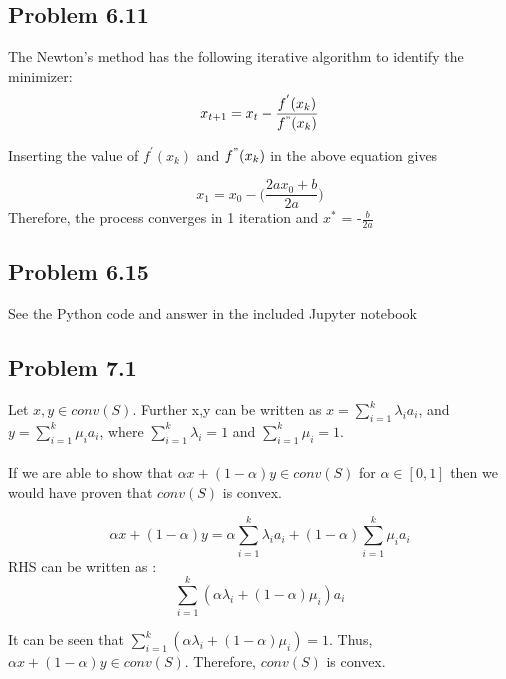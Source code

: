 \documentclass[letterpaper,12pt]{article}
\theoremstyle{definition}
\begin{document}
\subsection*{Problem 6.11}

The Newton's method has the following iterative algorithm to identify the minimizer:
  \begin{equation*}
x_{t+1}  =x_{t} - \frac{f^{'}(x_k)}{f^{"}(x_k)}
\end{equation*}  
\begin{flushleft}
Inserting the value of $f^{'}(x_k)$ and $f^{"}(x_k)$ in the above equation gives
\end{flushleft}
  \begin{equation*}
x_{1}  =x_{0} - \Big(\frac{2ax_{0}+b}{2a}\Big)
\end{equation*} 
Therefore, the process converges in 1 iteration and $x^*$ =  -$\frac{b}{2a}$ 



\subsection*{Problem 6.15}

See the Python code and answer in the included Jupyter notebook

\subsection*{Problem 7.1}

Let $x,y \in conv(S)$. Further x,y can be written as $x = \sum_{i=1}^{k} \lambda_i a_i $, and $y = \sum_{i=1}^{k} \mu_i a_i$, where $\sum_{i=1}^{k} \lambda_i =1 $ and $ \sum_{i=1}^{k} \mu_i = 1 $.\\\\
If we are able to show that $\alpha x + (1-\alpha) y \in conv(S)$ for $\alpha \in [0,1]$ then we would have proven that $conv(S)$  is convex.

\begin{equation*}
\alpha x + (1-\alpha) y = \alpha\sum_{i=1}^{k} \lambda_ia_i   + (1-\alpha)\sum_{i=1}^{k}\mu_i a_i 
\end{equation*}
RHS can be written as :
\begin{equation*}
\sum_{i=1}^{k} (\alpha\lambda_i  + (1-\alpha)\mu_i) a_i 
\end{equation*}
\begin{flushleft}
It can be seen that $\sum_{i=1}^{k} ( \alpha \lambda_i   + (1-\alpha)\mu_i)  = 1$. Thus, $\alpha x + (1- \alpha) y \in conv(S)$. Therefore, $ conv(S)$ is convex.
\end{flushleft}
\end{document}
